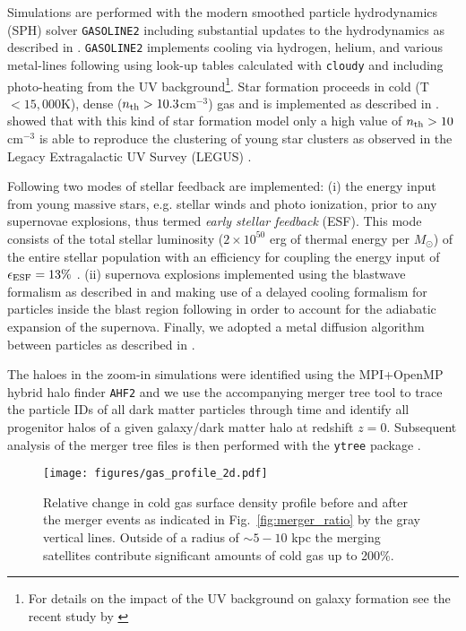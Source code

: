 \documentclass[useAMS,usenatbib]{mnras}
\begin{document}
Simulations are performed with the modern smoothed particle hydrodynamics (SPH) solver {\texttt{GASOLINE2}} \citep{Wadsley2017} including substantial updates to the hydrodynamics as described in \citet{Keller2014}. {\texttt{GASOLINE2}} implements cooling via hydrogen, helium, and various metal-lines following \citet{Shen2010} using look-up tables calculated with \texttt{cloudy} \citep[version 07.02;][]{Ferland1998} and including photo-heating from the \citet{Haardt2005} UV background\footnote{For details on the impact of the UV background on galaxy formation see the recent study by \citet{Obreja2019}}. Star formation proceeds in cold (T $< 15,000$K), dense ($n_{\rm  th}  >  10.3$cm$^{-3}$) gas and is implemented as described in \citet{Stinson2006}. \citet{Buck2019a} showed that with this kind of star formation model only a high value of $n_{\rm  th}>10$cm$^{-3}$ \citep[see also][for an extended parameter study]{Dutton2019,Dutton2020} is able to reproduce the clustering of young star clusters as observed in the Legacy Extragalactic UV Survey (LEGUS) \citep{Calzetti2015,Grasha2017}.

Following \citet{Stinson2013} two modes of stellar feedback are implemented: (i) the energy input from young massive stars, e.g. stellar winds and photo ionization, prior to any supernovae explosions, thus termed \textit{early stellar feedback} (ESF). This mode consists of the total stellar luminosity ($2 \times 10^{50}$ erg of thermal energy per $M_{\odot}$) of the entire stellar population with an efficiency for coupling the energy input of $\epsilon_{\rm ESF}=13\%$ \citep{Wang2015}. (ii) supernova explosions implemented using the blastwave formalism as described in \citet{Stinson2006} and making use of a delayed cooling formalism for particles inside the blast region following \citet{McKee1977} in order to account for the adiabatic expansion of the supernova.
Finally, we adopted a metal diffusion algorithm between particles as described in \citet{Wadsley2008}.

The haloes in the zoom-in simulations were identified using the MPI+OpenMP hybrid halo finder \texttt{AHF2} \citep{Knollmann2009} and we use the accompanying merger tree tool to trace the particle IDs of all dark matter particles through time and identify all progenitor halos of a given galaxy/dark matter halo at redshift $z=0$. Subsequent analysis of the merger tree files is then performed with the {\texttt {ytree}} package \citep{ytree}. 

\begin{figure}
    \begin{centering}
        \texttt{[image: figures/gas\_profile\_2d.pdf]}
        \vspace*{-1.75em}
        \caption{
            Relative change in cold gas surface density profile before and after the merger events as indicated in Fig.~\ref{fig:merger_ratio} by the gray vertical lines. Outside of a radius of $\sim5-10$ kpc the merging satellites contribute significant amounts of cold gas up to 200\%.
        }
        \label{fig:surf_den}
    \end{centering}
\end{figure}
\end{document}
